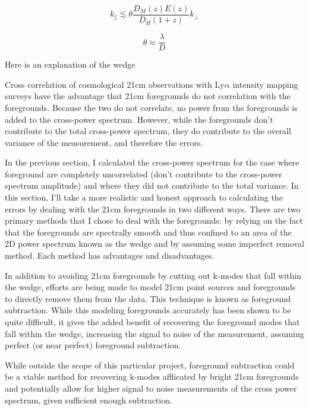\begin{equation}
    k_{\parallel} \lesssim  \theta \frac{D_{M}\left( z \right) E \left( z \right)}{D_H \left(1 + z\right)} k_{\perp}
\end{equation}

\begin{equation}
    \theta \approx \frac{\lambda}{D}
\end{equation}

Here is an explanation of the wedge

Cross correlation of cosmological 21cm observations with Ly$\alpha$ intensity
mapping surveys have the advantage that 21cm foregrounds do not correlation with
the foregrounds. Because the two do not correlate, no power from the foregrounds
is added to the cross-power spectrum. However, while the foregrounds don't contribute
to the total cross-power spectrum, they do contribute to the overall variance
of the measurement, and therefore the errors.

In the previous section, I calculated the cross-power spectrum for the case where
foreground are completely uncorrelated (don't contribute to the cross-power spectrum
amplitude) and where they did not contribute to the total variance. In this section,
I'll take a more realistic and honest approach to calculating the errors by dealing
with the 21cm foregrounds in two different ways. There are two primary methods
that I chose to deal with the foregrounds: by relying on the fact that the foregrounds
are spectrally smooth and thus confined to an area of the 2D power spectrum known
as the wedge and by assuming some imperfect removal method. Each method has advantages
and disadvantages.

In addition to avoiding 21cm foregrounds by cutting out k-modes that fall within
the wedge, efforts are being made to model 21cm point sources and foregrounds to
directly remove them from the data. This technique is known as foreground subtraction.
While this modeling foregrounds accurately has been shown to be quite difficult,
it gives the added benefit of recovering the foreground modes that fall within
the wedge, increasing the signal to noise of the measurement, assuming perfect (or
near perfect) foreground subtraction.

While outside the scope of this particular project, foreground subtraction could
be a viable method for recovering k-modes afflicated by bright 21cm foregrounds
and potentially allow for higher signal to noise measurements of the cross power
spectrum, given sufficient enough subtraction.

